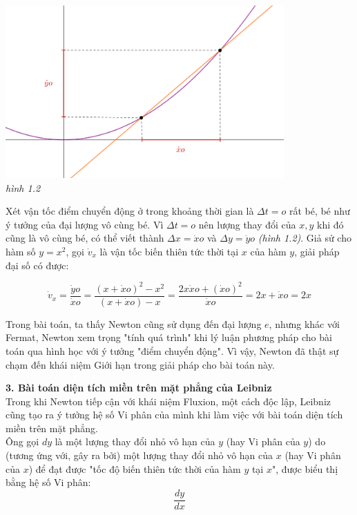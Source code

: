 \documentclass[a4paper,12pt]{article}
\begin{document}
\begin{center}
	\includegraphics[width=0.8\textwidth]{newton}\\
	\textit{hình 1.2}
\end{center}
 
Xét vận tốc điểm chuyển động ở trong khoảng thời gian là $\Delta t=o$ rất bé, bé như ý tưởng của đại lượng vô cùng bé. Vì $\Delta t=o$ nên lượng thay đổi của $x, y$ khi đó cũng là vô cùng bé, có thể viết thành $\Delta x=\dot{x}o$ và $\Delta y=\dot{y}o$ \textit{(hình 1.2)}. Giả sử cho hàm số $y=x^2$, gọi $\dot{v}_x$ là vận tốc biến thiên tức thời tại $x$ của hàm $y$, giải pháp đại số có được:

$$\dot{v}_x=\frac{\dot{y}o}{\dot{x}o}=\frac{(x+\dot{x}o)^2-x^2}{(x+\dot{x}o)-x}=\frac{2x\dot{x}o+(\dot{x}o)^2}{\dot{x}o}=2x+\dot{x}o=2x$$

Trong bài toán, ta thấy Newton cũng sử dụng đến đại lượng $e$, nhưng khác với Fermat, Newton xem trọng "tính quá trình" khi lý luận phương pháp cho bài toán qua hình học với ý tưởng "điểm chuyển động". Vì vậy, Newton đã thật sự chạm đến khái niệm Giới hạn trong giải pháp cho bài toán này.\\
\newline

\textbf{3. Bài toán diện tích miền trên mặt phẳng của Leibniz}\\

Trong khi Newton tiếp cận với khái niệm Fluxion, một cách độc lập, Leibniz cũng tạo ra ý tưởng hệ số Vi phân của mình khi làm việc với bài toán diện tích miền trên mặt phẳng.\\ 

Ông gọi $dy$ là một lượng thay đổi nhỏ vô hạn của $y$ (hay Vi phân của $y$) do (tương ứng với, gây ra bởi) một lượng thay đổi nhỏ vô hạn của $x$ (hay Vi phân của $x$) để đạt được "tốc độ biến thiên tức thời của hàm $y$ tại $x$", được biểu thị bằng hệ số Vi phân: $$\frac{dy}{dx}$$
\end{document}
